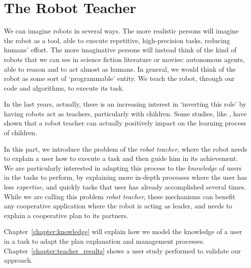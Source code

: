 \part{The Robot Teacher} %

\label{part:robot_teacher} %


We can imagine robots in several ways. The more realistic persons will imagine the robot as a tool, able to execute repetitive, high-precision tasks, reducing humans' effort. The more imaginative persons will instead think of the kind of robots that we can see in science fiction literature or movies: autonomous agents, able to reason and to act almost as humans. In general, we would think of the robot as some sort of `programmable' entity. We teach the robot, through our code and algorithms, to execute its task.

In the last years, actually, there is an increasing interest in `inverting this role' by having robots act as teachers, particularly with children. Some studies, like \cite{movellan2009sociable}, have shown that a robot teacher can actually positively impact on the learning process of children.

In this part, we introduce the problem of the \textit{robot teacher}, where the robot needs to explain a user how to execute a task and then guide him in its achievement. We are particularly interested in adapting this process to the \textit{knowledge} of users in the tasks to perform, by explaining more in-depth processes where the user has less \textit{expertise}, and quickly tasks that user has already accomplished several times. While we are calling this problem \textit{robot teacher}, these mechanisms can benefit any cooperative application where the robot is acting as leader, and needs to explain a cooperative plan to its partners.  

Chapter~\ref{chapter:knowledge} will explain how we model the knowledge of a user in a task to adapt the plan explanation and management processes. Chapter~\ref{chapter:teacher_results} shows a user study performed to validate our approach.

 
 
